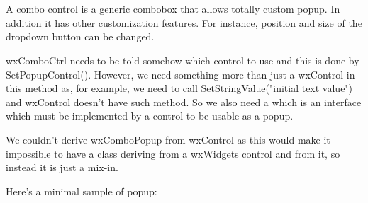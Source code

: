 
\section{}\label{wxcomboctrl}

A combo control is a generic combobox that allows totally
custom popup. In addition it has other customization features.
For instance, position and size of the dropdown button
can be changed.


wxComboCtrl needs to be told somehow which control to use
and this is done by SetPopupControl(). However, we need
something more than just a wxControl in this method as,
for example, we need to call SetStringValue("initial text value")
and wxControl doesn't have such method. So we also need a
 which is an interface which
must be implemented by a control to be usable as a popup.

We couldn't derive wxComboPopup from wxControl as this would make it
impossible to have a class deriving from a wxWidgets control and from
it, so instead it is just a mix-in.

Here's a minimal sample of  popup:

